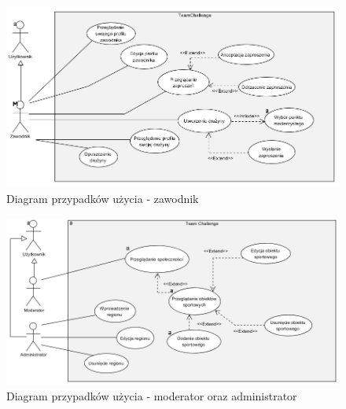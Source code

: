\begin{figure}[H]
\centering
\includegraphics[width=\linewidth]{04-projekt/rys/usecase2.PNG}
\caption{Diagram przypadków użycia - zawodnik}
\label{fig:diagram-uc-2}
\end{figure}

\begin{figure}[H]
\centering
\includegraphics[width=\linewidth]{04-projekt/rys/usecase4.PNG}
\caption{Diagram przypadków użycia - moderator oraz administrator}
\label{fig:diagram-uc-3}
\end{figure}

